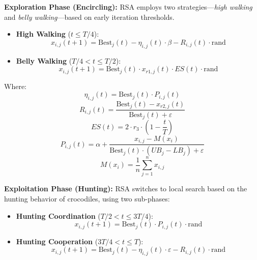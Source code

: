 \documentclass[12pt]{article}
\begin{document}
\textbf{Exploration Phase (Encircling):}
RSA employs two strategies—\textit{high walking} and \textit{belly walking}—based on early iteration thresholds.

\begin{itemize}
    \item \textbf{High Walking} (\(t \leq T/4\)):
    \begin{equation}
        x_{i,j}(t+1) = \text{Best}_j(t) - \eta_{i,j}(t) \cdot \beta - R_{i,j}(t) \cdot \text{rand}
    \end{equation}
    
    \item \textbf{Belly Walking} (\(T/4 < t \leq T/2\)):
    \begin{equation}
        x_{i,j}(t+1) = \text{Best}_j(t) \cdot x_{r1,j}(t) \cdot ES(t) \cdot \text{rand}
    \end{equation}
\end{itemize}

Where:
\begin{equation}
    \eta_{i,j}(t) = \text{Best}_j(t) \cdot P_{i,j}(t)
\end{equation}
\begin{equation}
    R_{i,j}(t) = \frac{\text{Best}_j(t) - x_{r2,j}(t)}{\text{Best}_j(t) + \varepsilon}
\end{equation}
\begin{equation}
    ES(t) = 2 \cdot r_3 \cdot \left(1 - \frac{t}{T} \right)
\end{equation}
\begin{equation}
    P_{i,j}(t) = \alpha + \frac{x_{i,j} - M(x_i)}{\text{Best}_j(t) \cdot (UB_j - LB_j) + \varepsilon}
\end{equation}
\begin{equation}
    M(x_i) = \frac{1}{n} \sum_{j=1}^{n} x_{i,j}
\end{equation}

\textbf{Exploitation Phase (Hunting):}
RSA switches to local search based on the hunting behavior of crocodiles, using two sub-phases:

\begin{itemize}
    \item \textbf{Hunting Coordination} (\(T/2 < t \leq 3T/4\)):
    \begin{equation}
        x_{i,j}(t+1) = \text{Best}_j(t) \cdot P_{i,j}(t) \cdot \text{rand}
    \end{equation}

    \item \textbf{Hunting Cooperation} (\(3T/4 < t \leq T\)):
    \begin{equation}
        x_{i,j}(t+1) = \text{Best}_j(t) - \eta_{i,j}(t) \cdot \varepsilon - R_{i,j}(t) \cdot \text{rand}
    \end{equation}
\end{itemize}
\end{document}
